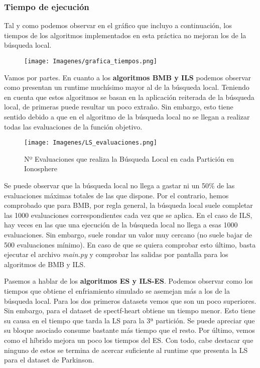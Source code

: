 \documentclass[10pt, a4paper]{article}
\theoremstyle{theorem-style}
\theoremstyle{theorem-style}
\theoremstyle{theorem2-style}
\theoremstyle{definition-style}
\theoremstyle{remark-style}
\theoremstyle{example-style}
\theoremstyle{definition-style}
\theoremstyle{remark-style}
\theoremstyle{remark-style}
\begin{document}
\subsubsection{Tiempo de ejecución}

Tal y como podemos observar en el gráfico que incluyo a continuación, los tiempos de los algoritmos implementados en esta práctica no mejoran los de la búsqueda local.

\pagebreak 
\begin{figure}[htp]
\centering
\texttt{[image: Imagenes/grafica\_tiempos.png]}
\label{}
\end{figure} Vamos por partes. En cuanto a los \textbf{algoritmos BMB y ILS} podemos observar como presentan un runtime muchísimo mayor al de la búsqueda local. Teniendo en cuenta que estos algoritmos se basan en la aplicación reiterada de la búsqueda local, de primeras puede resultar un poco extraño. Sin embargo, esto tiene sentido debido a que en el algoritmo de la búsqueda local no se llegan a realizar todas las evaluaciones de la función objetivo. 

\begin{figure}[htp]
\centering
\texttt{[image: Imagenes/LS\_evaluaciones.png]}
\caption{Nº Evaluaciones que realiza la Búsqueda Local en cada Partición en Ionosphere}
\label{}
\end{figure}

Se puede observar que la búsqueda local no llega a gastar ni un 50\% de las evaluaciones máximas totales de las que dispone. Por el contrario, hemos comprobado que para BMB, por regla general, la búsqueda local suele completar las 1000 evaluaciones correspondientes cada vez que se aplica. En el caso de ILS, hay veces en las que una ejecución de la búsqueda local no llega a esas 1000 evaluaciones. Sin embargo, suele rondar un valor muy cercano (no suele bajar de 500 evaluaciones mínimo). En caso de que se quiera comprobar esto último, basta ejecutar el archivo \textit{main.py} y comprobar las salidas por pantalla para los algoritmos de BMB y ILS. 

Pasemos a hablar de los \textbf{algoritmos ES y ILS-ES}. Podemos observar como los tiempos que obtiene el enfriamiento simulado se asemejan más a los de la búsqueda local. Para los dos primeros datasets vemos que son un poco superiores. Sin embargo, para el dataset de spectf-heart obtiene un tiempo menor. Esto tiene su causa en el tiempo que tarda la LS para la 3ª partición. Se puede apreciar que su bloque asociado consume bastante más tiempo que el resto. Por último, vemos como el híbrido mejora un poco los tiempos del ES. Con todo, cabe destacar que ninguno de estos se termina de acercar suficiente al runtime que presenta la LS para el dataset de Parkinson. 
\end{document}
